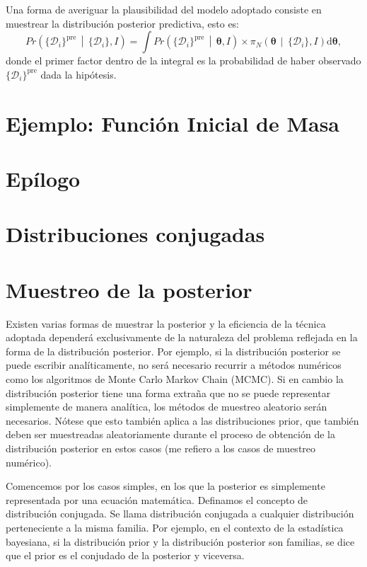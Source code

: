\documentclass[a4paper,twoside]{article}
\newcommand{\hip}{\ensuremath{\mathbold{\theta}}\xspace}
\newcommand{\dat}{\ensuremath{\{\mathcal{D}_i\}}\xspace}
\newcommand{\pos}[2]{\ensuremath{\pi_N\left(#1\,\middle|\, #2\right)}\xspace}
\newcommand{\pro}[2]{\ensuremath{Pr\left(#1\,\middle|\, #2\right)}\xspace}
\begin{document}
Una forma de averiguar la plausibilidad del modelo adoptado consiste en muestrear la distribución
posterior predictiva, esto es:
%
\begin{equation}
\pro{\dat^\text{pre}}{\dat,I} = \int\pro{\dat^\text{pre}}{\hip,I}\times\pos{\hip}{\dat,I}\text{d}\hip,
\end{equation}
%
donde el primer factor dentro de la integral es la probabilidad de haber observado
\(\dat^\text{pre}\) dada la hipótesis.


\section{Ejemplo: Función Inicial de Masa}


\section{Epílogo}

\appendix

\section{Distribuciones conjugadas}\label{sc:conjugate-pdf}


\section{Muestreo de la posterior}

Existen varias formas de muestrar la posterior y la eficiencia de la técnica adoptada dependerá
exclusivamente de la naturaleza del problema reflejada en la forma de la distribución posterior. Por
ejemplo, si la distribución posterior se puede escribir analíticamente, no será necesario recurrir a
métodos numéricos como los algoritmos de Monte Carlo Markov Chain (MCMC). Si en cambio la
distribución posterior tiene una forma extraña que no se puede representar simplemente de manera
analítica, los métodos de muestreo aleatorio serán necesarios. Nótese que esto también aplica a las
distribuciones prior, que también deben ser muestreadas aleatoriamente durante el proceso de
obtención de la distribución posterior en estos casos (me refiero a los casos de muestreo numérico).

Comencemos por los casos simples, en los que la posterior es simplemente representada por una
ecuación matemática. Definamos el concepto de distribución conjugada. Se llama distribución
conjugada a cualquier distribución perteneciente a la misma familia. Por ejemplo, en el contexto de
la estadística bayesiana, si la distribución prior y la distribución posterior son familias, se dice
que el prior es el conjudado de la posterior y viceversa.
\end{document}

